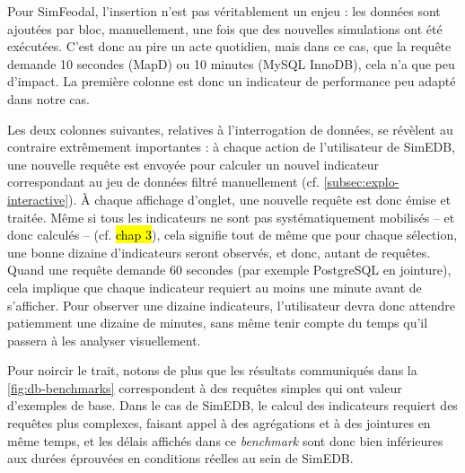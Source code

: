 Pour SimFeodal, l'insertion n'est pas véritablement un enjeu : les données sont ajoutées par bloc, manuellement, une fois que des nouvelles simulations ont été exécutées.
C'est donc au pire un acte quotidien, mais dans ce cas, que la requête demande 10 secondes (MapD) ou 10 minutes (MySQL InnoDB), cela n'a que peu d'impact.
La première colonne est donc un indicateur de performance peu adapté dans notre cas.

Les deux colonnes suivantes, relatives à l'interrogation de données, se révèlent au contraire extrêmement importantes : à chaque action de l'utilisateur de SimEDB, une nouvelle requête est envoyée pour calculer un nouvel indicateur correspondant au jeu de données filtré manuellement (cf. \cref{subsec:explo-interactive}).
À chaque affichage d'onglet, une nouvelle requête est donc émise et traitée. Même si tous les indicateurs ne sont pas systématiquement mobilisés -- et donc calculés -- (cf. \hl{chap 3}), cela signifie tout de même que pour chaque sélection, une bonne dizaine d'indicateurs seront observés, et donc, autant de requêtes.
Quand une requête demande 60 secondes (par exemple PostgreSQL en \og jointure\fg{}), cela implique que chaque indicateur requiert au moins une minute avant de s'afficher.
Pour observer une dizaine indicateurs, l'utilisateur devra donc attendre patiemment une dizaine de minutes, sans même tenir compte du temps qu'il passera à les analyser visuellement.

Pour noircir le trait, notons de plus que les résultats communiqués dans la \cref{fig:db-benchmarks} correspondent à des requêtes simples qui ont valeur d'exemples de base.
Dans le cas de SimEDB, le calcul des indicateurs requiert des requêtes plus complexes, faisant appel à des agrégations et à des jointures en même temps, et les délais affichés dans ce \textit{benchmark} sont donc bien inférieures aux durées éprouvées en conditions réelles au sein de SimEDB.


